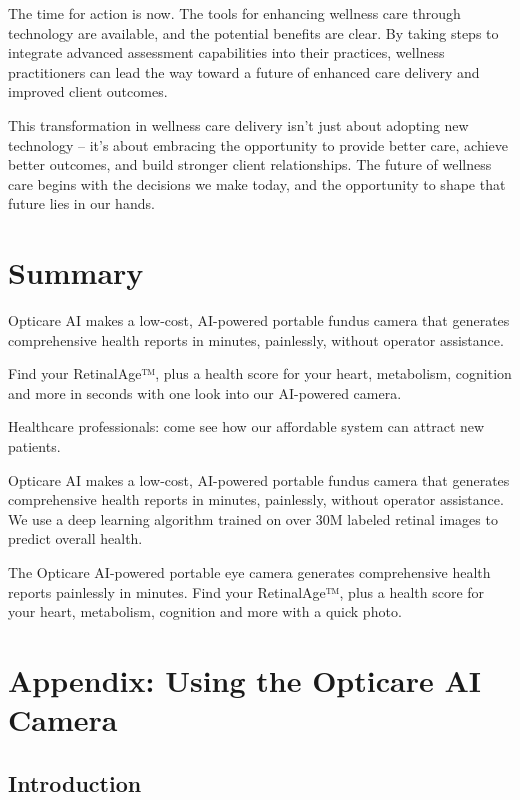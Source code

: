 \documentclass[
  Letterpaper,
]{scrbook}
\begin{document}
The time for action is now. The tools for enhancing wellness care
through technology are available, and the potential benefits are clear.
By taking steps to integrate advanced assessment capabilities into their
practices, wellness practitioners can lead the way toward a future of
enhanced care delivery and improved client outcomes.

This transformation in wellness care delivery isn't just about adopting
new technology -- it's about embracing the opportunity to provide better
care, achieve better outcomes, and build stronger client relationships.
The future of wellness care begins with the decisions we make today, and
the opportunity to shape that future lies in our hands.


\chapter{Summary}\label{summary}

Opticare AI makes a low-cost, AI-powered portable fundus camera that
generates comprehensive health reports in minutes, painlessly, without
operator assistance.

Find your RetinalAge™, plus a health score for your heart, metabolism,
cognition and more in seconds with one look into our AI-powered camera.

Healthcare professionals: come see how our affordable system can attract
new patients.

Opticare AI makes a low-cost, AI-powered portable fundus camera that
generates comprehensive health reports in minutes, painlessly, without
operator assistance. We use a deep learning algorithm trained on over
30M labeled retinal images to predict overall health.

The Opticare AI-powered portable eye camera generates comprehensive
health reports painlessly in minutes. Find your RetinalAge™, plus a
health score for your heart, metabolism, cognition and more with a quick
photo.


\chapter{Appendix: Using the Opticare AI
Camera}\label{appendix-using-the-opticare-ai-camera}

\section{Introduction}\label{introduction-4}
\end{document}
